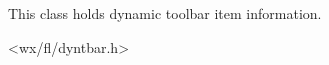 %
%


\section{}\label{wxdyntoolinfo}


This class holds dynamic toolbar item information.




<wx/fl/dyntbar.h>


